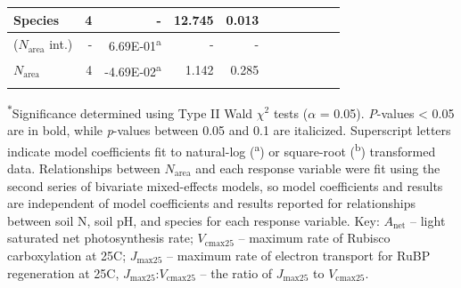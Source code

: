 \begin{landscape}
\begin{table}
{\begin{tabular}{p{2.5cm}p{0.5cm}p{2cm}p{1.5cm}p{1.5cm}p{2cm}p{1.5cm}p{1.5cm}p{2cm}p{1.5cm}p{1.5cm}}
            Species & \multicolumn{1}{r}{4}
            & \multicolumn{1}{r}{-} & \multicolumn{1}{r}{12.745} & \multicolumn{1}{r}{\textbf{0.013}} \\
            \hline

            ($N_\mathrm{area}$ int.) & \multicolumn{1}{r}{-}
            & \multicolumn{1}{r}{6.69E-01\textsuperscript{a}} & \multicolumn{1}{r}{-} & \multicolumn{1}{r}{-}
            &&&&&& 
            \\

            $N_\mathrm{area}$ & \multicolumn{1}{r}{4}
            & \multicolumn{1}{r}{-4.69E-02\textsuperscript{a}} & \multicolumn{1}{r}{1.142} & \multicolumn{1}{r}{0.285}
            &&&&&
            \\
            \hline

            &&&&&&&&&& 
        \end{tabular}}
        \label{tab:table3.2}
    \end{table}
\begin{singlespace}
\noindent \textsuperscript{$*$}Significance determined using Type II Wald $\chi^{2}$ tests ($\alpha$ = 0.05). \textit{P}-values < 0.05 are in bold, while \textit{p}-values between 0.05 and 0.1 are italicized. Superscript letters indicate model coefficients fit to natural-log (\textsuperscript{a}) or square-root (\textsuperscript{b}) transformed data. Relationships between $N_\mathrm{area}$ and each response variable were fit using the second series of bivariate mixed-effects models, so model coefficients and results are independent of model coefficients and results reported for relationships between soil N, soil pH, and species for each response variable. Key: $A_\mathrm{net}$ – light saturated net photosynthesis rate; $V_\mathrm{cmax25}$ – maximum rate of Rubisco carboxylation at 25\textdegree{}C; $J_\mathrm{max25}$ – maximum rate of electron transport for RuBP regeneration at 25\textdegree{}C, $J_{\mathrm{max25}}$:$V_\mathrm{cmax25}$ – the ratio of $J_\mathrm{max25}$ to $V_\mathrm{cmax25}$.
\end{singlespace}
\end{landscape}
\clearpage

